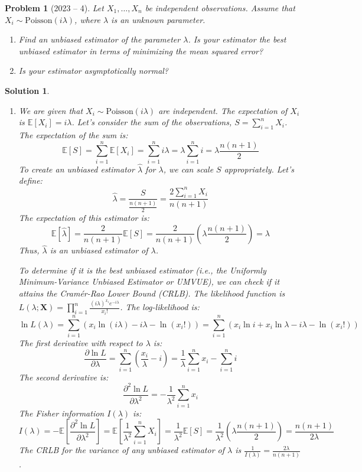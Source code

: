 \documentclass[12pt]{amsart}
\newtheorem{problem}{Problem}
\newtheorem*{solution}{Solution}
\begin{document}
\begin{problem}[2023 -- 4]
Let $X_1, \ldots, X_n$ be independent observations. Assume that $X_i \sim \text{Poisson}(i \lambda)$, where $\lambda$ is an unknown parameter.
\begin{enumerate}[label=(\alph*)]
\item Find an unbiased estimator of the parameter $\lambda$. Is your estimator the best unbiased estimator in terms of minimizing the mean squared error?
\item Is your estimator asymptotically normal?
\end{enumerate}
\end{problem}
\begin{solution}
\begin{enumerate}[label=(\alph*)]
\item 
We are given that $X_i \sim \text{Poisson}(i \lambda)$ are independent. The expectation of $X_i$ is $\mathbb{E}[X_i] = i \lambda$.
Let's consider the sum of the observations, $S = \sum_{i=1}^n X_i$.
The expectation of the sum is:
$$ \mathbb{E}[S] = \sum_{i=1}^n \mathbb{E}[X_i] = \sum_{i=1}^n i\lambda = \lambda \sum_{i=1}^n i = \lambda \frac{n(n+1)}{2} $$
To create an unbiased estimator $\hat{\lambda}$ for $\lambda$, we can scale $S$ appropriately. Let's define:
$$ \hat{\lambda} = \frac{S}{\frac{n(n+1)}{2}} = \frac{2 \sum_{i=1}^n X_i}{n(n+1)} $$
The expectation of this estimator is:
$$ \mathbb{E}[\hat{\lambda}] = \frac{2}{n(n+1)} \mathbb{E}[S] = \frac{2}{n(n+1)} \left(\lambda \frac{n(n+1)}{2}\right) = \lambda $$
Thus, $\hat{\lambda}$ is an unbiased estimator of $\lambda$.

To determine if it is the best unbiased estimator (i.e., the Uniformly Minimum-Variance Unbiased Estimator or UMVUE), we can check if it attains the Cramér-Rao Lower Bound (CRLB).
The likelihood function is $L(\lambda; \mathbf{X}) = \prod_{i=1}^n \frac{(i\lambda)^{x_i} e^{-i\lambda}}{x_i!}$.
The log-likelihood is:
$$ \ln L(\lambda) = \sum_{i=1}^n (x_i \ln(i\lambda) - i\lambda - \ln(x_i!)) = \sum_{i=1}^n (x_i \ln i + x_i \ln\lambda - i\lambda - \ln(x_i!)) $$
The first derivative with respect to $\lambda$ is:
$$ \frac{\partial \ln L}{\partial \lambda} = \sum_{i=1}^n \left(\frac{x_i}{\lambda} - i\right) = \frac{1}{\lambda}\sum_{i=1}^n x_i - \sum_{i=1}^n i $$
The second derivative is:
$$ \frac{\partial^2 \ln L}{\partial \lambda^2} = -\frac{1}{\lambda^2} \sum_{i=1}^n x_i $$
The Fisher information $I(\lambda)$ is:
$$ I(\lambda) = -\mathbb{E}\left[\frac{\partial^2 \ln L}{\partial \lambda^2}\right] = \mathbb{E}\left[\frac{1}{\lambda^2} \sum_{i=1}^n X_i\right] = \frac{1}{\lambda^2} \mathbb{E}[S] = \frac{1}{\lambda^2} \left(\lambda \frac{n(n+1)}{2}\right) = \frac{n(n+1)}{2\lambda} $$
The CRLB for the variance of any unbiased estimator of $\lambda$ is $\frac{1}{I(\lambda)} = \frac{2\lambda}{n(n+1)}$.


\end{enumerate}
\end{solution}
\end{document}
